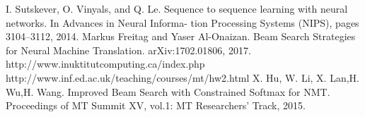 \documentclass[a4paper]{article}
\begin{document}





\newpage
\begin{thebibliography}{9}
  I. Sutskever, O. Vinyals, and Q. Le. 
  Sequence to sequence learning with neural networks. 
  In Advances in Neural Informa- tion Processing Systems (NIPS), pages 3104–3112, 2014.
  Markus Freitag and Yaser Al-Onaizan. 
  Beam Search Strategies for Neural Machine Translation. arXiv:1702.01806, 2017.
  http://www.inuktitutcomputing.ca/index.php
  http://www.inf.ed.ac.uk/teaching/courses/mt/hw2.html
  X. Hu, W. Li, X. Lan,H. Wu,H. Wang. 
  Improved Beam Search with Constrained Softmax for NMT. 
  Proceedings of MT Summit XV, vol.1: MT Researchers' Track, 2015.
\end{thebibliography}



%
%
%
\newpage
\end{document}
